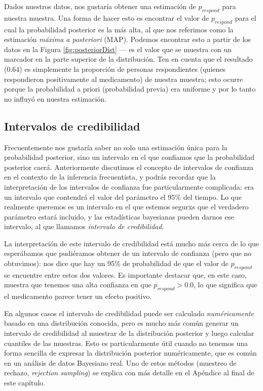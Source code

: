 \documentclass[
  12pt,
]{book}
\begin{document}
Dados nuestros datos, nos gustaría obtener una estimación de \(p_{respond}\) para nuestra muestra. Una forma de hacer esto es encontrar el valor de \(p_{respond}\) para el cual la probabilidad posterior es la más alta, al que nos referimos como la estimación \emph{máxima a posteriori} (MAP). Podemos encontrar esto a partir de los datos en la Figura \ref{fig:posteriorDist} --- es el valor que se muestra con un marcador en la parte superior de la distribución. Ten en cuenta que el resultado (0.64) es simplemente la proporción de personas respondientes (quienes respondieron positivamente al medicamento) de nuestra muestra; esto ocurre porque la probabilidad a priori (probabilidad previa) era uniforme y por lo tanto no influyó en nuestra estimación.

\hypertarget{intervalos-de-credibilidad}{%
\subsection{Intervalos de credibilidad}\label{intervalos-de-credibilidad}}

Frecuentemente nos gustaría saber no solo una estimación única para la probabilidad posterior, sino un intervalo en el que confiamos que la probabilidad posterior caerá. Anteriormente discutimos el concepto de intervalos de confianza en el contexto de la inferencia frecuentista, y podrás recordar que la interpretación de los intervalos de confianza fue particularmente complicada: era un intervalo que contendrá el valor del parámetro el 95\% del tiempo. Lo que realmente queremos es un intervalo en el que estemos segurxs que el verdadero parámetro estará incluido, y las estadísticas bayesianas pueden darnos ese intervalo, al que llamamos \emph{intervalo de credibilidad}.

La interpretación de este intervalo de credibilidad está mucho más cerca de lo que esperábamos que pudiéramos obtener de un intervalo de confianza (pero que no obtuvimos): nos dice que hay un 95\% de probabilidad de que el valor de \(p_{respond}\) se encuentre entre estos dos valores. Es importante destacar que, en este caso, muestra que tenemos una alta confianza en que \(p_{respond} > 0.0\), lo que significa que el medicamento parece tener un efecto positivo.

En algunos casos el intervalo de credibilidad puede ser calculado \emph{numéricamente} basado en una distribución conocida, pero es mucho más común generar un intervalo de credibilidad al muestrar de la distribución posterior y luego calcular cuantiles de las muestras. Esto es particularmente útil cuando no tenemos una forma sencilla de expresar la distribución posterior numéricamente, que es común en un análisis de datos Bayesiano real. Uno de estos métodos (muestreo de rechazo, \emph{rejection sampling}) se explica con más detalle en el Apéndice al final de este capítulo.
\end{document}
